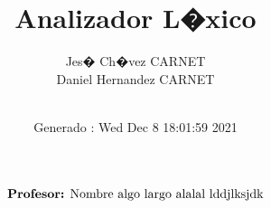 \documentclass[letterpaper,twoside,12pt]{article}
\title{Analizador L�xico}
\date {Generado : Wed Dec  8 18:01:59 2021
}\author{Jes� Ch�vez CARNET \\  Daniel Hernandez CARNET \\ \\}
\begin{document}
\begin{titlepage}
\maketitle
\sffamily
\begin{align*}
\text{\textbf{Profesor:} Nombre algo largo alalal lddjlksjdk} \\ 
\end{align*}
\end{titlepage}
\end{document}
